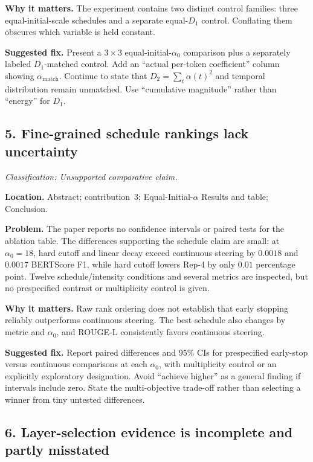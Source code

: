 \documentclass[11pt]{article}
\newcommand{\findinglabel}[1]{\textbf{#1}}
\newcommand{\classification}[1]{\textit{Classification: #1.}}
\begin{document}
\findinglabel{Why it matters.} The experiment contains two distinct control families: three equal-initial-scale schedules and a separate equal-$D_1$ control.  Conflating them obscures which variable is held constant.

\findinglabel{Suggested fix.} Present a $3\times3$ equal-initial-$\alpha_0$ comparison plus a separately labeled $D_1$-matched control.  Add an ``actual per-token coefficient'' column showing $\alpha_{\mathrm{match}}$.  Continue to state that $D_2=\sum_t\alpha(t)^2$ and temporal distribution remain unmatched.  Use ``cumulative magnitude'' rather than ``energy'' for $D_1$.

\subsection*{5. Fine-grained schedule rankings lack uncertainty}

\classification{Unsupported comparative claim}

\findinglabel{Location.} Abstract; contribution~3; Equal-Initial-$\alpha$ Results and table; Conclusion.

\findinglabel{Problem.} The paper reports no confidence intervals or paired tests for the ablation table.  The differences supporting the schedule claim are small: at $\alpha_0=18$, hard cutoff and linear decay exceed continuous steering by $0.0018$ and $0.0017$ BERTScore F1, while hard cutoff lowers Rep-4 by only $0.01$ percentage point.  Twelve schedule/intensity conditions and several metrics are inspected, but no prespecified contrast or multiplicity control is given.

\findinglabel{Why it matters.} Raw rank ordering does not establish that early stopping reliably outperforms continuous steering.  The best schedule also changes by metric and $\alpha_0$, and ROUGE-L consistently favors continuous steering.

\findinglabel{Suggested fix.} Report paired differences and 95\% CIs for prespecified early-stop versus continuous comparisons at each $\alpha_0$, with multiplicity control or an explicitly exploratory designation.  Avoid ``achieve higher'' as a general finding if intervals include zero.  State the multi-objective trade-off rather than selecting a winner from tiny untested differences.

\subsection*{6. Layer-selection evidence is incomplete and partly misstated}
\end{document}
